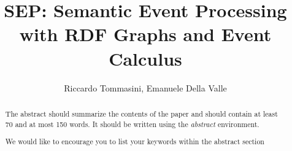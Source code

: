 \documentclass[runningheads,a4paper]{llncs}
\newcommand{\keywords}[1]{\par\addvspace\baselineskip
\noindent\keywordname\enspace\ignorespaces#1}
\begin{document}
\title{SEP: Semantic Event Processing with RDF Graphs and Event Calculus}



\maketitle

\author{Riccardo Tommasini, Emanuele Della Valle}



\begin{abstract}
The abstract should summarize the contents of the paper and should
contain at least 70 and at most 150 words. It should be written using the
\emph{abstract} environment.
\keywords{We would like to encourage you to list your keywords within
the abstract section}
\end{abstract}



\end{document}
